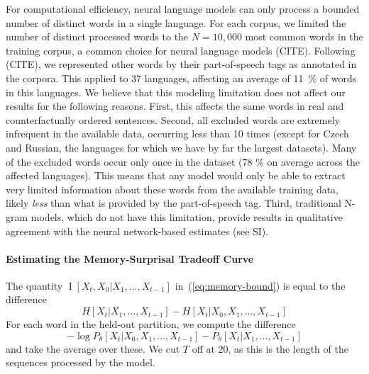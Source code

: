 \documentclass[11pt,letterpaper]{article}
\begin{document}
For computational efficiency, neural language models can only process a bounded number of distinct words in a single language.
For each corpus, we limited the number of distinct processed words to the $N=10,000$ most common words in the training corpus, a common choice for neural language models (CITE).
Following (CITE), we represented other words by their part-of-speech tags as annotated in the corpora.
This applied to 37 languages, affecting an average of 11~\% of words in this languages.
We believe that this modeling limitation does not affect our results for the following reasons.
First, this affects the same words in real and counterfactually ordered sentences.
Second, all excluded words are extremely infrequent in the available data, occurring less than 10 times (except for Czech and Russian, the languages for which we have by far the largest datasets).
Many of the excluded words occur only once in the dataset (78 \% on average across the affected languages).
This means that any model would only be able to extract very limited information about these words from the available training data, likely \emph{less} than what is provided by the part-of-speech tag.
Third, traditional N-gram models, which do not have this limitation, provide results in qualitative agreement with the neural network-based estimates (see SI).




\paragraph{Estimating the Memory-Surprisal Tradeoff Curve}



The quantity $\operatorname{I}[X_t, X_0 | X_1, ..., X_{t-1}]$ in~(\ref{eq:memory-bound}) is equal to the difference 
\begin{equation}
H[X_t|X_1, ..., X_{t-1}] - H[X_t|X_0, X_1, ..., X_{t-1}]
\end{equation}
For each word in the held-out partition, we compute the difference
\begin{equation}
	-\log P_\theta[X_t | X_0, X_1, ..., X_{t-1}] - P_\theta[X_t | X_1, ..., X_{t-1}]
\end{equation}
and take the average over these.
We cut $T$ off at 20, as this is the length of the sequences processed by the model.
\end{document}
